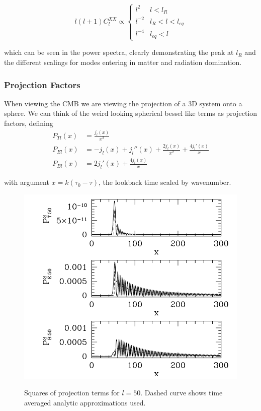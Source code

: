 \documentclass[a4paper,10pt]{article}
\begin{document}
\begin{equation}
  l(l+1)C_l^{XX} \propto
    \begin{cases}
      l^2 & l<l_R\\
      l^{-2} & l_R<l<l_{eq}\\
      l^{-4} & l_{eq}<l
    \end{cases}       
\end{equation}

which can be seen in the power spectra, clearly demonstrating the peak at $l_R$ and the different scalings for modes entering in matter and radiation domination.


\subsubsection{Projection Factors}

When viewing the CMB we are viewing the projection of a 3D system onto a sphere. We can think of the weird looking spherical bessel like terms as projection factors, defining
\begin{align}
P_{Tl}(x) &= \frac{j_l(x)}{x^2}\\
P_{El}(x) &= -j_l(x) +j_l''(x)+\frac{2j_l(x)}{x^2} + \frac{4j_l'(x)}{x}\\
P_{Bl}(x) &= 2j_l'(x)+\frac{4j_l(x)}{x}
\end{align}

with argument $x=k(\tau_0-\tau)$, the lookback time scaled by wavenumber. 

\begin{figure}[h]
  \includegraphics[width=0.7\linewidth]{projection.png}
  \label{proj}
  \centering
  \caption{Squares of projection terms for $l=50$. Dashed curve shows time averaged analytic approximations used.}
\end{figure}
\end{document}

